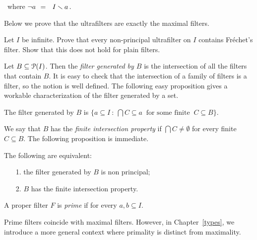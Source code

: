 \documentclass[creche.tex]{subfiles}
\begin{document}
\, \hfill where \emph{$\neg a$}$\ \ =\ \ I\sm a\, .$

Below we prove that the ultrafilters are exactly the maximal filters.

\begin{exercise}
Let $I$ be infinite. Prove that every non-principal ultrafilter on $I$ contains Fr\'echet's filter. Show that this does not hold for plain filters. \QED
\end{exercise}

Let $B\subseteq\P(I)$. Then the \emph{filter generated by $B$\/} is the intersection of all the filters that contain $B$. It is easy to check that the intersection of a family of filters is a filter, so the notion is well defined. The following easy proposition gives a workable characterization of the filter generated by a set.

\begin{proposition} The filter generated by $B$ is $\big\{a\subseteq I\ :\ \bigcap C\subseteq a\ \textrm{ for some finite }\ C\subseteq B\big\}$.\QED

\end{proposition}

We say that $B$ has the \emph{finite intersection property\/} if $\bigcap C\neq\emptyset$ for every finite $C\subseteq B$. The following proposition is immediate.

\begin{proposition} The following are equivalent:
\begin{itemize}
\item[1.] the filter generated by $B$ is non principal;
\item[2.] $B$ has the finite intersection property.\QED
\end{itemize}
\end{proposition}

A proper filter $F$ is \emph{prime\/} if for every $a,b\subseteq I$.


Prime filters coincide with maximal filters. However, in Chapter~\ref{types}, we introduce a more general context where primality is distinct from maximality.
\end{document}
